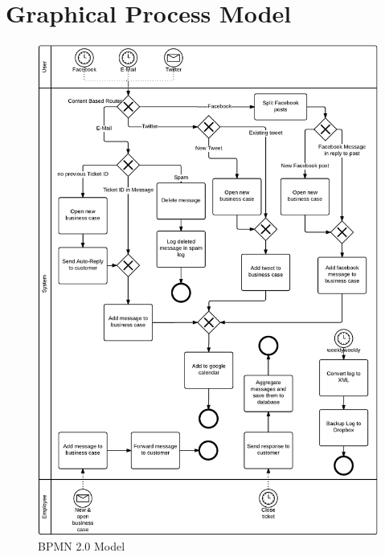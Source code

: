 \newpage
\section{Graphical Process Model}
\begin{figure}[ht!]
	\centering \includegraphics[width=1.00\linewidth]{./media/BPMN-2-0.pdf}
	\caption{BPMN 2.0 Model}
	\label{fig:bpmn}
\end{figure}

